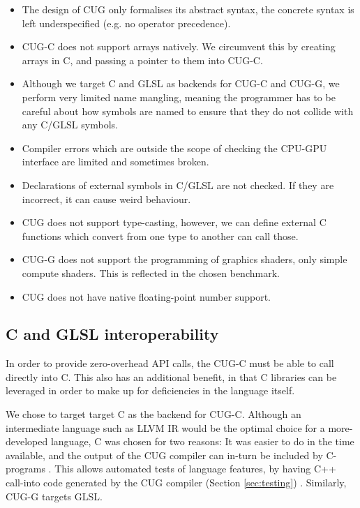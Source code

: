 \documentclass[a4paper,12pt,twoside,openright]{report}
\begin{document}
\begin{itemize}

    \item The design of CUG only formalises its abstract syntax, the concrete
    syntax is left underspecified (e.g. no operator precedence).

    \item CUG-C does not support arrays natively. We circumvent this by
    creating arrays in C, and passing a pointer to them into CUG-C.

    \item Although we target C and GLSL as backends for CUG-C and CUG-G, we
    perform very limited name mangling, meaning the programmer has to be
    careful about how symbols are named to ensure that they do not collide with
    any C/GLSL symbols.

    \item Compiler errors which are outside the scope of checking the CPU-GPU
    interface are limited and sometimes broken.

    \item Declarations of external symbols in C/GLSL are not checked. If they are
    incorrect, it can cause weird behaviour.

    \item CUG does not support type-casting, however, we can define external C
    functions which convert from one type to another can call those.

    \item CUG-G does not support the programming of graphics shaders, only
    simple compute shaders. This is reflected in the chosen benchmark.

    \item CUG does not have native floating-point number support.

\end{itemize}

\subsection{C and GLSL interoperability}

In order to provide zero-overhead API calls, the CUG-C must be able to call
directly into C. This also has an additional benefit, in that C libraries can
be leveraged in order to make up for deficiencies in the language itself.

We chose to target target C as the backend for CUG-C. Although an intermediate
language such as LLVM IR would be the optimal choice for a more-developed
language, C was chosen for two reasons: It was easier to do in the time
available, and the output of the CUG compiler can in-turn be included by
C-programs \cite{TODO}. This allows automated tests of language features, by
having C++ call-into code generated by the CUG compiler (Section
\ref{sec:testing}) \cite{AutomatedTestCode} \cite{AutomatedTestOutput}.
Similarly, CUG-G targets GLSL.
\end{document}
